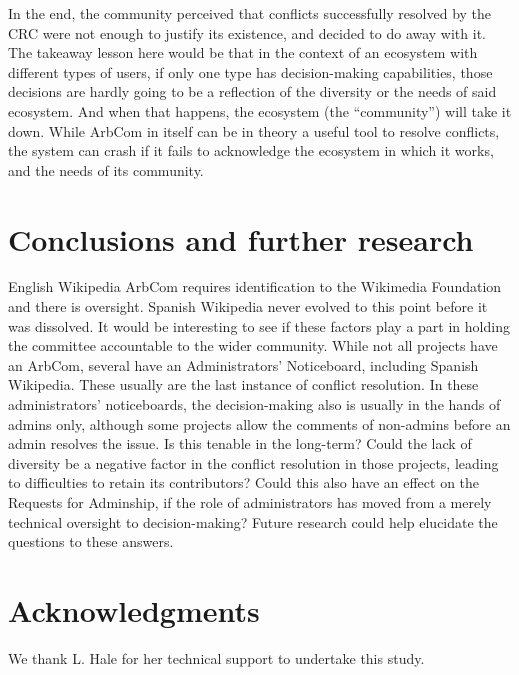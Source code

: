 \documentclass{sigchi}
\begin{document}
In the end, the community perceived that
conflicts successfully resolved by the CRC were not enough to justify its existence, and decided to
do away with it. The takeaway lesson here would be that in the context of an ecosystem 
with different types
of users, if only one type has decision-making capabilities, those decisions are hardly going to
be a reflection of the diversity or the needs of said ecosystem. And when that happens, the
ecosystem (the “community”) will take it down. While ArbCom in itself can be in theory a useful
tool to resolve conflicts, the system can crash if it fails to acknowledge the ecosystem in which
it works, and the needs of its community.

\section{Conclusions and further research}

English Wikipedia ArbCom requires identification to the Wikimedia Foundation and there is
oversight. Spanish Wikipedia never evolved to this point before it was dissolved. It would be
interesting to see if these factors play a part in holding the committee accountable to the wider
community.
While not all projects have an ArbCom, several have an Administrators’ Noticeboard, including
Spanish Wikipedia. These usually are the last instance of conflict resolution. In these
administrators’ noticeboards, the decision-making also is usually in the hands of admins only,
although some projects allow the comments of non-admins before an admin resolves the issue. Is
this tenable in the long-term? Could the lack of diversity be a negative factor in the conflict
resolution in those projects, leading to difficulties to retain its contributors? Could this also
have an effect on the Requests for Adminship, if the role of administrators has moved from a
merely technical oversight to decision-making? Future research could help
elucidate the questions to these answers. 

\section{Acknowledgments}

We thank L. Hale for her technical support to undertake this study.

\balance





\end{document}
